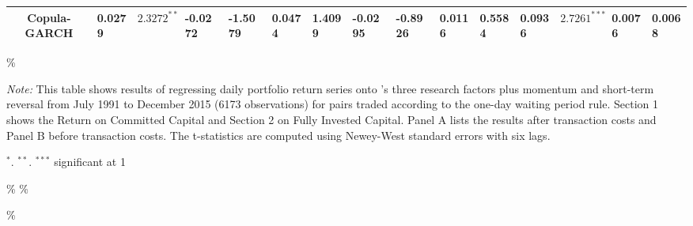 \documentclass[a4paper]{article}
\begin{document}
\begin{sidewaystable}
\begin{threeparttable}[H]
\begin{tabularx}{\textwidth}{@{\extracolsep{\fill}}lllllllllllllll@{}}
			\multicolumn{1}{c}{Copula-GARCH} & 0.0279 & $2.3272^{**}$ & -0.0272 & -1.5079 & 0.0474 & 1.4099 & -0.0295 & -0.8926 & 0.0116 & 0.5584 & 0.0936 & $2.7261^{***}$ & 0.0076 & 0.0068  \\
			\bottomrule
		\end{tabularx}\%
		\begin{tablenotes}
			\item \textit{Note:} \scriptsize  This table shows results of regressing daily portfolio return series onto \citet*{ff93}'s three research factors plus momentum and short-term reversal from July 1991 to December 2015 (6173 observations) for pairs traded according to the one-day waiting period rule. Section 1 shows the Return on Committed Capital and Section 2 on Fully Invested Capital. Panel A lists the results after transaction costs and Panel B before transaction costs. The t-statistics are computed using Newey-West standard errors with six lags.
			\item \scriptsize $^{\ast}$. $^{\ast\ast}$. $^{\ast\ast\ast}$  significant at 1\\%
		\end{tablenotes}
	\end{threeparttable}\%
	\label{tab:table118}\%
\end{sidewaystable}\%
\end{document}
